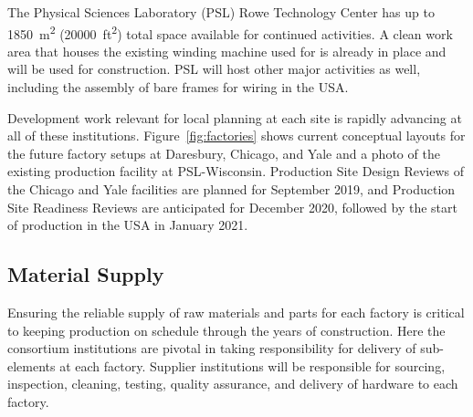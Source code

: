The Physical Sciences Laboratory (PSL) Rowe Technology Center has up to \SI{1850}{m^2} (\SI{20000}{ft^2}) total space available for continued  activities.  A clean work area that houses the existing winding machine used for  is already in place and will be used for   construction. PSL will host other major activities as well, including the assembly of bare  frames for wiring in the USA.

Development work relevant for local planning at each site is rapidly advancing at all of these institutions.  Figure~\ref{fig:factories} shows current conceptual layouts for the future factory setups at Daresbury, Chicago, and Yale and a photo of the existing  production facility at PSL-Wisconsin.  Production Site Design Reviews of the Chicago and Yale facilities are planned for September 2019, and Production Site Readiness Reviews are anticipated for December 2020, followed by the start of  production in the USA in January 2021.  
 

\subsection{Material Supply}  
\label{sec:fdsp-apa-prod-supply}

Ensuring the reliable supply of raw materials and parts for each factory is critical to keeping  production on schedule through the years of construction. Here the consortium institutions are pivotal in taking responsibility for delivery of  sub-elements at each factory. Supplier institutions will be responsible for sourcing, inspection, cleaning, testing, quality assurance, and delivery of hardware to each factory. 

